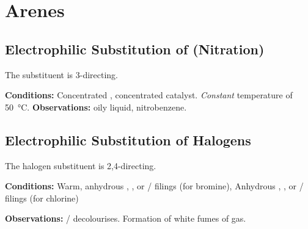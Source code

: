 




	\pagebreak
	\section{Arenes}

		\subsection{Electrophilic Substitution of  (Nitration)}

			The  substituent is 3-directing.

			\vspace{1.5em}
			\vbox{\textbf{Conditions:}	\tabto{35mm}Concentrated , concentrated  catalyst.
										\tabto{35mm}\textit{Constant} temperature of \SI{50}{\celsius}.}
			\vspace{0.75em}
			\vbox{\textbf{Observations:}\tabto{35mm} oily liquid, nitrobenzene.}





		\subsection{Electrophilic Substitution of Halogens}

			The halogen substituent is 2,4-directing.

			\vspace{1.5em}
			\vbox{\textbf{Conditions:}	\tabto{35mm}Warm, anhydrous , , or  / \ch{\aluminium} filings (for bromine),
										\tabto{35mm}Anhydrous , , or
													 / \ch{\aluminium} filings (for chlorine)}

			\vspace{0.75em}
			\vbox{\textbf{Observations:}\tabto{35mm}  /   decolourises.
										\tabto{35mm}Formation of white fumes of  gas.}

